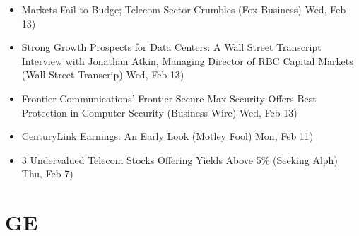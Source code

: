 \documentclass[11pt,asymmetric]{article}
\begin{document}
\begin{itemize}
\item Markets Fail to Budge; Telecom Sector Crumbles (Fox Business) Wed, Feb 13)
\item Strong Growth Prospects for Data Centers: A Wall Street Transcript Interview with Jonathan Atkin, Managing Director of RBC Capital Markets (Wall Street Transcrip) Wed, Feb 13)
\item Frontier Communications’ Frontier Secure Max Security Offers Best Protection in Computer Security (Business Wire) Wed, Feb 13)
\item CenturyLink Earnings: An Early Look (Motley Fool) Mon, Feb 11)
\item 3 Undervalued Telecom Stocks Offering Yields Above 5\% (Seeking Alph) Thu, Feb 7)
\end{itemize}

\section*{GE}
\end{document}
